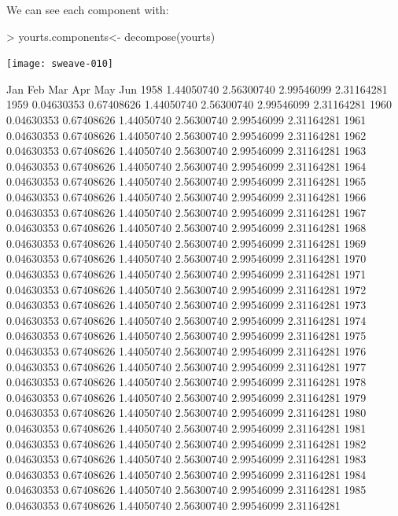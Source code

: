 \documentclass[11pt, a4paper]{article} %
\begin{document}
We can see each component with:
\begin{Schunk}
\begin{Sinput}
> yourts.components<- decompose(yourts)
\end{Sinput}
\end{Schunk}
\texttt{[image: sweave-010]}
\begin{Schunk}
\begin{Soutput}
             Jan         Feb         Mar         Apr         May         Jun
1958                          1.44050740  2.56300740  2.99546099  2.31164281
1959  0.04630353  0.67408626  1.44050740  2.56300740  2.99546099  2.31164281
1960  0.04630353  0.67408626  1.44050740  2.56300740  2.99546099  2.31164281
1961  0.04630353  0.67408626  1.44050740  2.56300740  2.99546099  2.31164281
1962  0.04630353  0.67408626  1.44050740  2.56300740  2.99546099  2.31164281
1963  0.04630353  0.67408626  1.44050740  2.56300740  2.99546099  2.31164281
1964  0.04630353  0.67408626  1.44050740  2.56300740  2.99546099  2.31164281
1965  0.04630353  0.67408626  1.44050740  2.56300740  2.99546099  2.31164281
1966  0.04630353  0.67408626  1.44050740  2.56300740  2.99546099  2.31164281
1967  0.04630353  0.67408626  1.44050740  2.56300740  2.99546099  2.31164281
1968  0.04630353  0.67408626  1.44050740  2.56300740  2.99546099  2.31164281
1969  0.04630353  0.67408626  1.44050740  2.56300740  2.99546099  2.31164281
1970  0.04630353  0.67408626  1.44050740  2.56300740  2.99546099  2.31164281
1971  0.04630353  0.67408626  1.44050740  2.56300740  2.99546099  2.31164281
1972  0.04630353  0.67408626  1.44050740  2.56300740  2.99546099  2.31164281
1973  0.04630353  0.67408626  1.44050740  2.56300740  2.99546099  2.31164281
1974  0.04630353  0.67408626  1.44050740  2.56300740  2.99546099  2.31164281
1975  0.04630353  0.67408626  1.44050740  2.56300740  2.99546099  2.31164281
1976  0.04630353  0.67408626  1.44050740  2.56300740  2.99546099  2.31164281
1977  0.04630353  0.67408626  1.44050740  2.56300740  2.99546099  2.31164281
1978  0.04630353  0.67408626  1.44050740  2.56300740  2.99546099  2.31164281
1979  0.04630353  0.67408626  1.44050740  2.56300740  2.99546099  2.31164281
1980  0.04630353  0.67408626  1.44050740  2.56300740  2.99546099  2.31164281
1981  0.04630353  0.67408626  1.44050740  2.56300740  2.99546099  2.31164281
1982  0.04630353  0.67408626  1.44050740  2.56300740  2.99546099  2.31164281
1983  0.04630353  0.67408626  1.44050740  2.56300740  2.99546099  2.31164281
1984  0.04630353  0.67408626  1.44050740  2.56300740  2.99546099  2.31164281
1985  0.04630353  0.67408626  1.44050740  2.56300740  2.99546099  2.31164281

\end{Soutput}
\end{Schunk}
\end{document}
